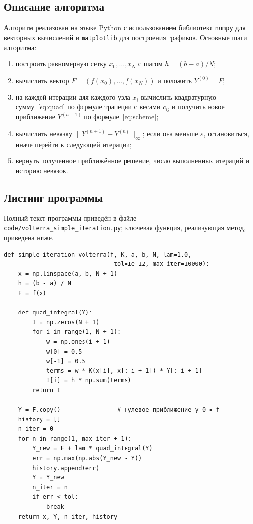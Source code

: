 \documentclass[a4paper,14pt]{extarticle}
\begin{document}
\subsection{Описание алгоритма}

Алгоритм реализован на языке Python с использованием библиотеки \texttt{numpy} для векторных вычислений и \texttt{matplotlib} для построения графиков. Основные шаги алгоритма:

\begin{enumerate}
\item построить равномерную сетку $x_0,\dots,x_N$ с шагом $h=(b-a)/N$;
\item вычислить вектор $F = (f(x_0),\dots,f(x_N))$ и положить $Y^{(0)} = F$;
\item на каждой итерации для каждого узла $x_i$ вычислить квадратурную сумму~\eqref{eq:quad} по формуле трапеций с весами $c_{ij}$ и получить новое приближение $Y^{(n+1)}$ по формуле~\eqref{eq:scheme};
\item вычислить невязку $\|Y^{(n+1)} - Y^{(n)}\|_\infty$; если она меньше $\varepsilon$, остановиться, иначе перейти к следующей итерации;
\item вернуть полученное приближённое решение, число выполненных итераций и историю невязок.
\end{enumerate}

\subsection{Листинг программы}

Полный текст программы приведён в файле \texttt{code/volterra\_simple\_iteration.py}; ключевая функция, реализующая метод, приведена ниже.

\begin{lstlisting}[style=py, caption={Функция, реализующая метод простой итерации для уравнения Вольтерра II рода}]
def simple_iteration_volterra(f, K, a, b, N, lam=1.0,
                               tol=1e-12, max_iter=10000):
    x = np.linspace(a, b, N + 1)
    h = (b - a) / N
    F = f(x)

    def quad_integral(Y):
        I = np.zeros(N + 1)
        for i in range(1, N + 1):
            w = np.ones(i + 1)
            w[0] = 0.5
            w[-1] = 0.5
            terms = w * K(x[i], x[: i + 1]) * Y[: i + 1]
            I[i] = h * np.sum(terms)
        return I

    Y = F.copy()                # нулевое приближение y_0 = f
    history = []
    n_iter = 0
    for n in range(1, max_iter + 1):
        Y_new = F + lam * quad_integral(Y)
        err = np.max(np.abs(Y_new - Y))
        history.append(err)
        Y = Y_new
        n_iter = n
        if err < tol:
            break
    return x, Y, n_iter, history
\end{lstlisting}
\end{document}
